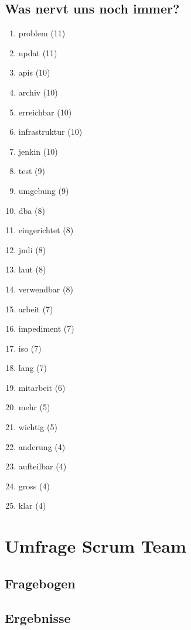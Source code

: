 \subsection*{Was nervt uns noch immer?}
\begin{enumerate}
    \item problem (11)
    \item updat (11)
    \item apis (10)
    \item archiv (10)
    \item erreichbar (10)
    \item infrastruktur (10)
    \item jenkin (10)
    \item test (9)
    \item umgebung (9)
    \item dba (8)
    \item eingerichtet (8)
    \item jndi (8)
    \item laut (8)
    \item verwendbar (8)
    \item arbeit (7)
    \item impediment (7)
    \item iso (7)
    \item lang (7)
    \item mitarbeit (6)
    \item mehr (5)
    \item wichtig (5)
    \item anderung (4)
    \item aufteilbar (4)
    \item gross (4)
    \item klar (4)
\end{enumerate}

\newpage
\section{Umfrage Scrum Team}

\subsection{Fragebogen}\label{appendix:questions}


\subsection{Ergebnisse}\label{appendix:answers}


